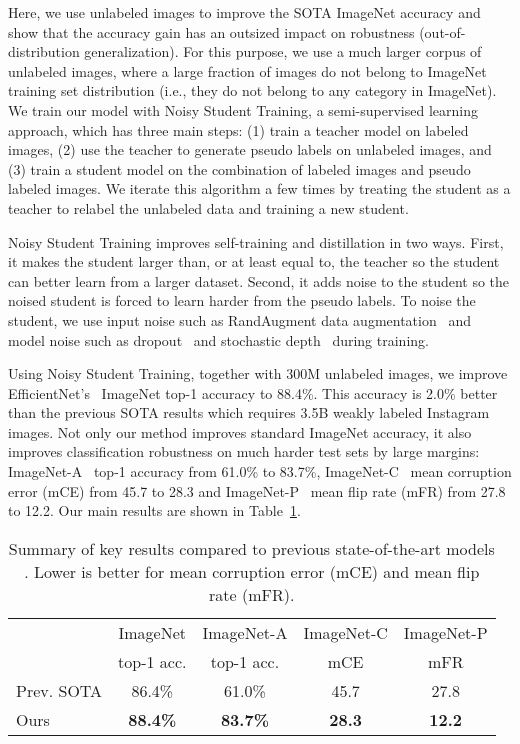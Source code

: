 \documentclass[10pt,twocolumn,letterpaper]{article}
\begin{document}
Here, we use unlabeled images to improve the SOTA ImageNet accuracy and show that the accuracy gain has an outsized impact on robustness (out-of-distribution generalization). For this purpose, we use a much larger corpus of unlabeled images, where a large fraction of images do not belong to ImageNet training set distribution (i.e., they do not belong to any category in ImageNet).
We train our model with Noisy Student Training, 
a semi-supervised learning approach,
which has three main steps: (1) train a teacher model on labeled images, (2) use the teacher to generate pseudo labels on unlabeled images, and (3) train a student model on the combination of labeled images and pseudo labeled images. We iterate this algorithm a few times by treating the student as a teacher to relabel the unlabeled data and training a new student.  

Noisy Student Training improves  self-training and distillation in two ways. First, it makes the student larger than, or at least equal to, the teacher so the student can better learn from a larger dataset. Second, it adds noise to the student so the noised student is forced to learn harder from the pseudo labels. To noise the student, we use input noise such as RandAugment data augmentation~\cite{cubuk2019randaugment} and model noise such as  dropout~\cite{srivastava2014dropout} and stochastic depth~\cite{huang2016deep} during training.


Using Noisy Student Training, together with 300M unlabeled images, we improve EfficientNet's~\cite{tan2019efficientnet} ImageNet top-1 accuracy to 88.4\%. 
This accuracy is 2.0\% better than the previous SOTA results which requires 3.5B weakly labeled Instagram images. Not only our method improves standard ImageNet  accuracy, it also  improves classification robustness on much harder test sets  by  large margins: ImageNet-A~\cite{hendrycks2019natural} top-1 accuracy from 61.0\% to 83.7\%, ImageNet-C~\cite{hendrycks2018benchmarking} mean corruption error (mCE) from 45.7 to 28.3 and ImageNet-P~\cite{hendrycks2018benchmarking} mean flip rate (mFR) from 27.8 to 12.2. Our main results are shown in Table~\ref{tab:summary}.

\begin{table}[h!]
\footnotesize
    \centering 
        \begin{tabular}{l|cccc}           
        \toprule 
          &  ImageNet & ImageNet-A & ImageNet-C & ImageNet-P \\
          &  top-1 acc. & top-1 acc. & mCE & mFR \\
        \midrule      
        
        Prev. SOTA  & 86.4\% & 61.0\% & 45.7 & 27.8\\  Ours & \bf 88.4\% & \bf 83.7\% & \bf 28.3 & \bf 12.2\\
        \bottomrule
        \end{tabular}
    \caption{Summary of key results compared to previous state-of-the-art models \cite{touvron2019fixing,mahajan2018exploring}. Lower is better for mean corruption error (mCE) and mean flip rate (mFR).}  
    \label{tab:summary}
\end{table}
\end{document}
